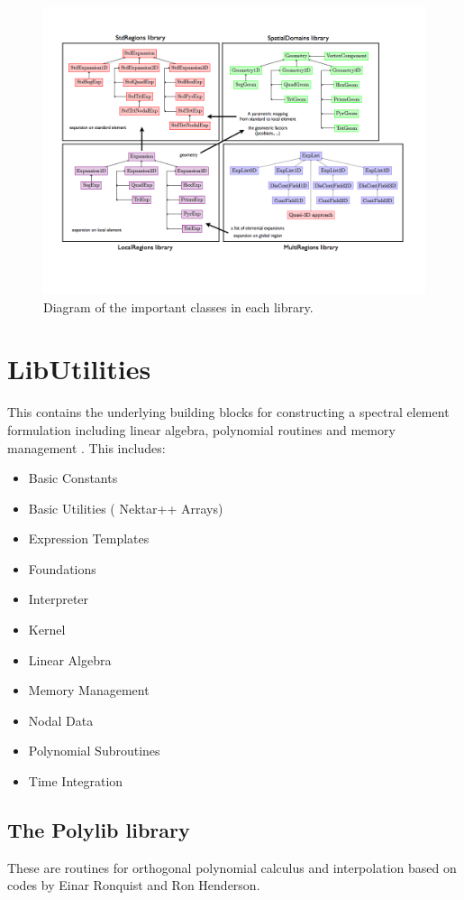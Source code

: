 \begin{figure}
\centering
\includegraphics[width=\textwidth]{img/overview.png}
\caption{Diagram of the important classes in each library.}
\label{f:library:overview}
\end{figure}

\section{LibUtilities}

This contains the underlying building blocks for constructing a spectral element
formulation including linear algebra, polynomial routines and memory management
\cite{Ga39,AbSt64,CaHuYoQu88,GhOs70,KaSh05}. This includes:
\begin{itemize}
\setlength{\itemsep}{0em}
\item Basic Constants
\item Basic Utilities ( Nektar++ Arrays)
\item Expression Templates
\item Foundations
\item Interpreter
\item Kernel
\item Linear Algebra
\item Memory Management
\item Nodal Data
\item Polynomial Subroutines
\item Time Integration
\end{itemize}

\subsection{The Polylib library}
These are routines for orthogonal polynomial calculus and interpolation based on
codes by Einar Ronquist and Ron Henderson.

